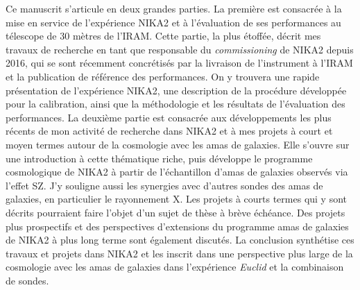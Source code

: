 



Ce manuscrit s'articule en deux grandes parties. La première est
consacrée à la mise en service de l'expérience NIKA2 et à l'évaluation
de ses performances au télescope de 30 mètres de l'IRAM. Cette partie,
la plus étoffée, décrit mes travaux de recherche en tant que
responsable du \emph{commissioning} de NIKA2 depuis 2016, qui se sont
récemment concrétisés par la livraison de l'instrument à l'IRAM et la
publication de référence des performances. On y trouvera une rapide
présentation de l'expérience NIKA2, une description de la procédure
développée pour la calibration, ainsi que la méthodologie et les
résultats de l'évaluation des performances.
La deuxième partie est consacrée aux développements les plus récents
de mon activité de recherche dans NIKA2 et à mes projets à court et
moyen termes autour de la cosmologie avec les amas de galaxies. Elle
s'ouvre sur une introduction à cette thématique riche, puis développe
le programme cosmologique de NIKA2 à partir de l'échantillon d'amas de
galaxies observés via l'effet SZ. J'y souligne aussi les synergies avec
d'autres sondes des amas de galaxies, en particulier le rayonnement
X. Les projets à courts termes qui y sont décrits pourraient faire
l'objet d'un sujet de thèse à brève échéance. Des projets plus
prospectifs et des perspectives d'extensions du programme amas de
galaxies de NIKA2 à plus long terme sont également
discutés. La conclusion synthétise ces travaux et projets dans NIKA2
et les inscrit dans une perspective plus large de la cosmologie avec
les amas de galaxies dans l'expérience \emph{Euclid} et la combinaison
de sondes.   





